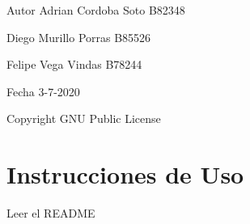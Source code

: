 \begin{DoxyAuthor}{Autor}
Adrian Cordoba Soto B82348 

Diego Murillo Porras B85526 

Felipe Vega Vindas B78244 
\end{DoxyAuthor}
\begin{DoxyDate}{Fecha}
3-\/7-\/2020
\end{DoxyDate}
\begin{DoxyCopyright}{Copyright}
G\+NU Public License
\end{DoxyCopyright}
\hypertarget{index_intro}{}\section{Instrucciones de Uso}\label{index_intro}
Leer el R\+E\+A\+D\+ME 